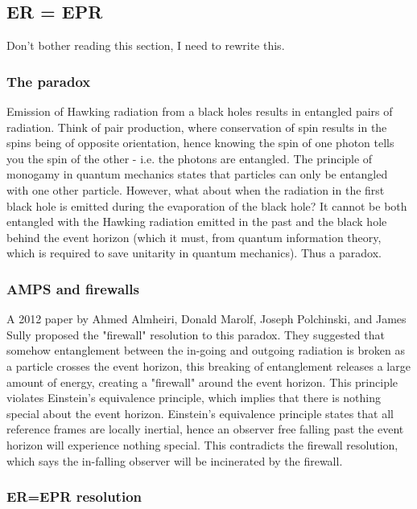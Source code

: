 \documentclass{article}
\begin{document}
\subsection{ER = EPR}
Don't bother reading this section, I need to rewrite this.


\subsubsection{The paradox}

Emission of Hawking radiation from a black holes results in entangled pairs of radiation. Think of pair production, where conservation of spin results in the spins being of opposite orientation, hence knowing the spin of one photon tells you the spin of the other - i.e. the photons are entangled. The principle of monogamy in quantum mechanics states that particles can only be entangled with one other particle. However, what about when the radiation in the first black hole is emitted during the evaporation of the black hole? It cannot be both entangled with the Hawking radiation emitted in the past and the black hole behind the event horizon (which it must, from quantum information theory, which is required to save unitarity in quantum mechanics). Thus a paradox. 

\subsubsection{AMPS and firewalls}\label{sec:Firewall}

A 2012 paper by Ahmed Almheiri, Donald Marolf, Joseph Polchinski, and James Sully proposed the "firewall" resolution to this paradox. They suggested that somehow entanglement between the in-going and outgoing radiation is broken as a particle crosses the event horizon, this breaking of entanglement releases a large amount of energy, creating a "firewall" around the event horizon. This principle violates Einstein's equivalence principle, which implies that there is nothing special about the event horizon. Einstein's equivalence principle states that all reference frames are locally inertial, hence an observer free falling past the event horizon will experience nothing special. This contradicts the firewall resolution, which says the in-falling observer will be incinerated by the firewall.

\subsubsection{ER=EPR resolution}
\end{document}
